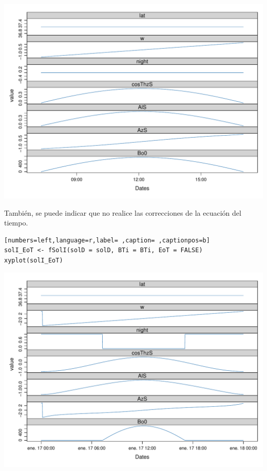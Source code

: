 \begin{center}
\includegraphics[width=\textwidth]{figuras/codigo-solIBTi.pdf}
\end{center}
  También, se puede indicar que no realice las correcciones de la ecuación del tiempo.
\begin{lstlisting}[numbers=left,language=r,label= ,caption= ,captionpos=b]
solI_EoT <- fSolI(solD = solD, BTi = BTi, EoT = FALSE)
xyplot(solI_EoT)
\end{lstlisting}

\begin{center}
\includegraphics[width=\textwidth]{figuras/codigo-solIEoT.pdf}
\end{center}

